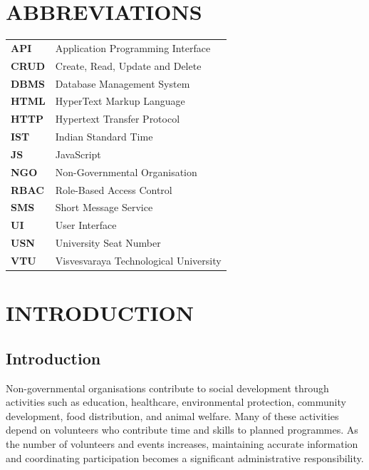 \documentclass[12pt,a4paper,oneside]{report}
\begin{document}
\clearpage

\chapter*{ABBREVIATIONS}
\begin{tabularx}{\textwidth}{>{\bfseries}l X}
API & Application Programming Interface\\
CRUD & Create, Read, Update and Delete\\
DBMS & Database Management System\\
HTML & HyperText Markup Language\\
HTTP & Hypertext Transfer Protocol\\
IST & Indian Standard Time\\
JS & JavaScript\\
NGO & Non-Governmental Organisation\\
RBAC & Role-Based Access Control\\
SMS & Short Message Service\\
UI & User Interface\\
USN & University Seat Number\\
VTU & Visvesvaraya Technological University\\
\end{tabularx}

\clearpage
\tableofcontents
\clearpage
\listoffigures
{}
\clearpage
\listoftables
{}
\clearpage


\chapter{INTRODUCTION}

\section{Introduction}
Non-governmental organisations contribute to social development through activities such as education, healthcare, environmental protection, community development, food distribution, and animal welfare. Many of these activities depend on volunteers who contribute time and skills to planned programmes. As the number of volunteers and events increases, maintaining accurate information and coordinating participation becomes a significant administrative responsibility.
\end{document}
